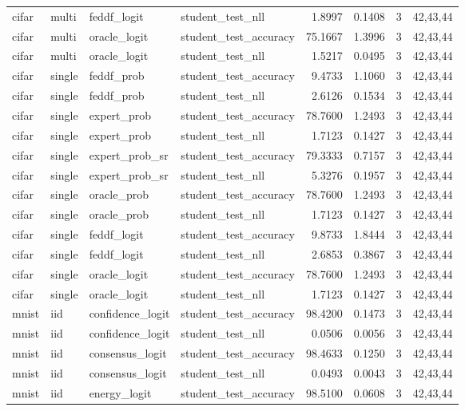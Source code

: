 \begin{tabular}{llllrrrl}
cifar & multi & feddf\_logit & student\_test\_nll & 1.8997 & 0.1408 & 3 & 42,43,44 \\
cifar & multi & oracle\_logit & student\_test\_accuracy & 75.1667 & 1.3996 & 3 & 42,43,44 \\
cifar & multi & oracle\_logit & student\_test\_nll & 1.5217 & 0.0495 & 3 & 42,43,44 \\
cifar & single & feddf\_prob & student\_test\_accuracy & 9.4733 & 1.1060 & 3 & 42,43,44 \\
cifar & single & feddf\_prob & student\_test\_nll & 2.6126 & 0.1534 & 3 & 42,43,44 \\
cifar & single & expert\_prob & student\_test\_accuracy & 78.7600 & 1.2493 & 3 & 42,43,44 \\
cifar & single & expert\_prob & student\_test\_nll & 1.7123 & 0.1427 & 3 & 42,43,44 \\
cifar & single & expert\_prob\_sr & student\_test\_accuracy & 79.3333 & 0.7157 & 3 & 42,43,44 \\
cifar & single & expert\_prob\_sr & student\_test\_nll & 5.3276 & 0.1957 & 3 & 42,43,44 \\
cifar & single & oracle\_prob & student\_test\_accuracy & 78.7600 & 1.2493 & 3 & 42,43,44 \\
cifar & single & oracle\_prob & student\_test\_nll & 1.7123 & 0.1427 & 3 & 42,43,44 \\
cifar & single & feddf\_logit & student\_test\_accuracy & 9.8733 & 1.8444 & 3 & 42,43,44 \\
cifar & single & feddf\_logit & student\_test\_nll & 2.6853 & 0.3867 & 3 & 42,43,44 \\
cifar & single & oracle\_logit & student\_test\_accuracy & 78.7600 & 1.2493 & 3 & 42,43,44 \\
cifar & single & oracle\_logit & student\_test\_nll & 1.7123 & 0.1427 & 3 & 42,43,44 \\
mnist & iid & confidence\_logit & student\_test\_accuracy & 98.4200 & 0.1473 & 3 & 42,43,44 \\
mnist & iid & confidence\_logit & student\_test\_nll & 0.0506 & 0.0056 & 3 & 42,43,44 \\
mnist & iid & consensus\_logit & student\_test\_accuracy & 98.4633 & 0.1250 & 3 & 42,43,44 \\
mnist & iid & consensus\_logit & student\_test\_nll & 0.0493 & 0.0043 & 3 & 42,43,44 \\
mnist & iid & energy\_logit & student\_test\_accuracy & 98.5100 & 0.0608 & 3 & 42,43,44 \\

\end{tabular}
